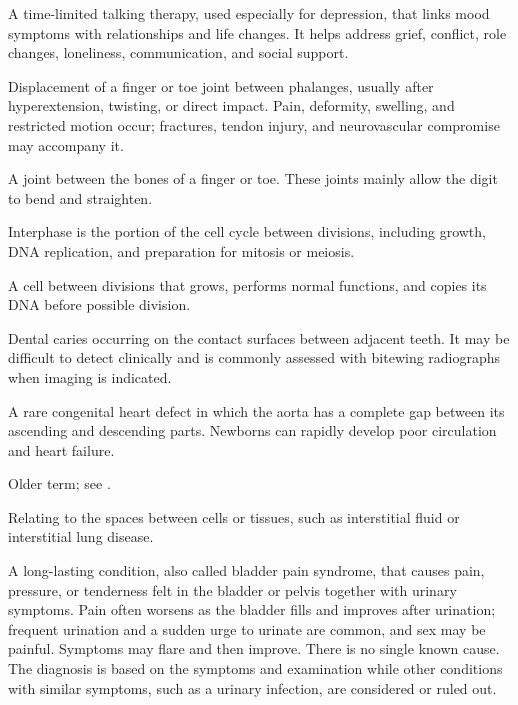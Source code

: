  A time-limited talking therapy, used especially for depression, that links mood symptoms with relationships and life changes. It helps address grief, conflict, role changes, loneliness, communication, and social support.

 Displacement of a finger or toe joint between phalanges, usually after hyperextension, twisting, or direct impact. Pain, deformity, swelling, and restricted motion occur; fractures, tendon injury, and neurovascular compromise may accompany it.

 A joint between the bones of a finger or toe. These joints mainly allow the digit to bend and straighten.

 Interphase is the portion of the cell cycle between divisions, including growth, DNA replication, and preparation for mitosis or meiosis.

 A cell between divisions that grows, performs normal functions, and copies its DNA before possible division.

 Dental caries occurring on the contact surfaces between adjacent teeth. It may be
difficult to detect clinically and is commonly assessed with bitewing radiographs when
imaging is indicated.

 A rare congenital heart defect in which the aorta has a complete gap between its ascending and descending parts. Newborns can rapidly develop poor circulation and heart failure.

 Older term; see .

 Relating to the spaces between cells or tissues, such as interstitial fluid or interstitial lung disease.

 A long-lasting condition, also called bladder pain syndrome, that causes pain, pressure, or tenderness felt in the bladder or pelvis together with urinary symptoms. Pain often worsens as the bladder fills and improves after urination; frequent urination and a sudden urge to urinate are common, and sex may be painful. Symptoms may flare and then improve. There is no single known cause. The diagnosis is based on the symptoms and examination while other conditions with similar symptoms, such as a urinary infection, are considered or ruled out.

